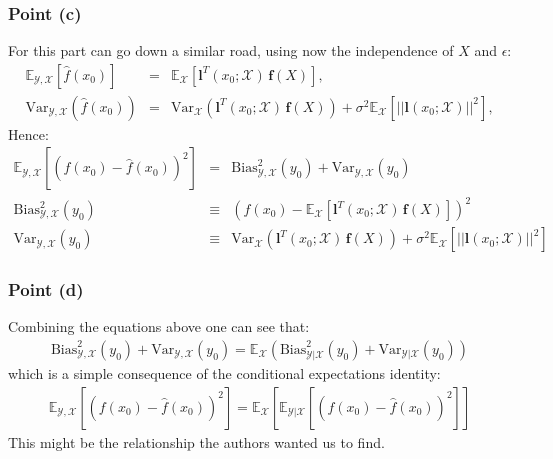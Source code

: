 \subsubsection*{Point (c)}

For this part can go down a similar road, using now the independence of $X$ and $\epsilon$:
\begin{eqnarray*}
    \mathbb{E}_{\mathcal{Y},\mathcal{X}} \left[ \hat{f}(x_0) \right] & = & \mathbb{E}_{\mathcal{X}} \left[ \bm{l}^T(x_0; \mathcal{X}) \, \bm{f}(X) \right],\\
    \textrm{Var}_{\mathcal{Y},\mathcal{X}}\left( \hat{f}(x_0) \right) & = & \textrm{Var}_{\mathcal{X}} \left( \bm{l}^T(x_0; \mathcal{X}) \, \bm{f}(X) \right) + 
    \sigma ^2 \mathbb{E}_{\mathcal{X}} \left[ ||\bm{l}(x_0; \mathcal{X})||^2  \right],
\end{eqnarray*}
Hence:
\begin{eqnarray*}
    \mathbb{E}_{\mathcal{Y}, \mathcal{X}} \left[ \left( f(x_0) - \hat{f}(x_0) \right)^2 \right] & = & \textrm{Bias}^2_{\mathcal{Y}, \mathcal{X}}(y_0) + \textrm{Var}_{\mathcal{Y}, \mathcal{X}}(y_0)\\
    \textrm{Bias}^2_{\mathcal{Y}, \mathcal{X}}(y_0) & \equiv &\left( f(x_0) - \mathbb{E}_{\mathcal{X}} \left[ \bm{l}^T(x_0; \mathcal{X}) \, \bm{f}(X) \right]  \right)^2\\
    \textrm{Var}_{\mathcal{Y}, \mathcal{X}}(y_0) & \equiv & \textrm{Var}_{\mathcal{X}} \left( \bm{l}^T(x_0; \mathcal{X}) \, \bm{f}(X) \right) + 
    \sigma ^2 \mathbb{E}_{\mathcal{X}} \left[ ||\bm{l}(x_0; \mathcal{X})||^2  \right]
\end{eqnarray*}

\subsubsection*{Point (d)}

Combining the equations above one can see that:
\begin{eqnarray*}
    \textrm{Bias}^2_{\mathcal{Y}, \mathcal{X}}(y_0) + \textrm{Var}_{\mathcal{Y}, \mathcal{X}}(y_0) = \mathbb{E}_{\mathcal{X}} \left( \textrm{Bias}^2_{\mathcal{Y}| \mathcal{X}}(y_0) + \textrm{Var}_{\mathcal{Y}| \mathcal{X}}(y_0) \right)
\end{eqnarray*}
which is a simple consequence of the conditional expectations identity:
\begin{eqnarray*}
    \mathbb{E}_{\mathcal{Y}, \mathcal{X}} \left[ \left( f(x_0) - \hat{f}(x_0) \right)^2 \right] =  \mathbb{E}_{\mathcal{X}} \left[ \mathbb{E}_{\mathcal{Y}| \mathcal{X}} \left[ \left( f(x_0) - \hat{f}(x_0) \right)^2 \right]  \right]
\end{eqnarray*}
{\color{red} This might be the relationship the authors wanted us to find.}